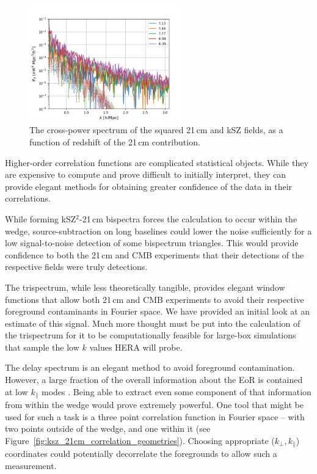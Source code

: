 \begin{figure}
\centering
\includegraphics[width=0.6\textwidth]{chapters/ksz_21cm/figures/trispec_estimator_filt_and_unfilt.png}
\caption[The cross-power spectrum of the squared 21\,cm and kSZ fields, as a function of redshift of the 21\,cm contribution.]{The cross-power spectrum of the squared 21\,cm and kSZ fields, as a function of redshift of the 21\,cm contribution.}
\end{figure}

Higher-order correlation functions are complicated statistical objects. While they are expensive to compute and prove difficult to initially interpret, they can provide elegant methods for obtaining greater confidence of the data in their correlations. 

While forming kSZ$^2$-21\,cm bispectra forces the calculation to occur within the wedge, source-subtraction on long baselines could lower the noise sufficiently for a low signal-to-noise detection of some bispectrum triangles. This would provide confidence to both the 21\,cm and CMB experiments that their detections of the respective fields were truly detections.

The trispectrum, while less theoretically tangible, provides elegant window functions that allow both 21\,cm and CMB experiments to avoid their respective foreground contaminants in Fourier space. We have provided an initial look at an estimate of this signal. Much more thought must be put into the calculation of the trispectrum for it to be computationally feasible for large-box simulations that sample the low $k$ values HERA will probe.

The delay spectrum is an elegant method to avoid foreground contamination. However, a large fraction of the overall information about the EoR is contained at low $k_{\parallel}$ modes \citep[e.g.][]{Jensen.16}. Being able to extract even some component of that information from within the wedge would prove extremely powerful. One tool that might be used for such a task is a three point correlation function in Fourier space -- with two points outside of the wedge, and one within it (see Figure~\ref{fig:ksz_21cm_correlation_geometries}). Choosing appropriate ($k_{\perp},k_{\parallel}$) coordinates could potentially decorrelate the foregrounds to allow such a measurement.
